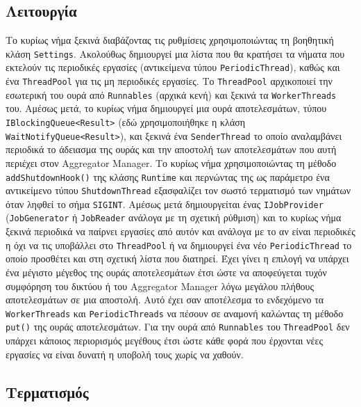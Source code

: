 \documentclass[a4paper,11pt]{article}
\begin{document}
\begin{sloppypar}
\begin{tabular}{lp{11cm}}
\end{tabular}

\subsection{Λειτουργία}

Το κυρίως νήμα ξεκινά διαβάζοντας τις ρυθμίσεις χρησιμοποιώντας τη βοηθητική κλάση \texttt{Settings}. Ακολούθως δημιουργεί μια λίστα που θα κρατήσει τα νήματα που εκτελούν τις περιοδικές εργασίες (αντικείμενα τύπου \texttt{PeriodicThread}), καθώς και ένα \texttt{ThreadPool} για τις μη περιοδικές εργασίες. Το \texttt{ThreadPool} αρχικοποιεί την εσωτερική του ουρά από \texttt{Runnables} (αρχικά κενή) και ξεκινά τα \texttt{WorkerThreads} του. Αμέσως μετά, το κυρίως νήμα δημιουργεί μια ουρά αποτελεσμάτων, τύπου \texttt{IBlockingQueue<Result>} (εδώ χρησιμοποιήθηκε η κλάση \texttt{WaitNotifyQueue<Result>}), και ξεκινά ένα \texttt{SenderThread} το οποίο αναλαμβάνει περιοδικά το άδειασμα της ουράς και την αποστολή των αποτελεσμάτων που αυτή περιέχει στον Aggregator Manager. Το κυρίως νήμα χρησιμοποιώντας τη μέθοδο \texttt{addShutdownHook()} της κλάσης \texttt{Runtime} και περνώντας της ως παράμετρο ένα αντικείμενο τύπου \texttt{ShutdownThread} εξασφαλίζει τον σωστό τερματισμό των νημάτων όταν ληφθεί το σήμα \texttt{SIGINT}. Αμέσως μετά δημιουργείται ένας \texttt{IJobProvider} (\texttt{JobGenerator} ή \texttt{JobReader} ανάλογα με τη σχετική ρύθμιση) και το κυρίως νήμα ξεκινά περιοδικά να παίρνει εργασίες από αυτόν και ανάλογα με το αν είναι περιοδικές η όχι να τις υποβάλλει στο \texttt{ThreadPool} ή να δημιουργεί ένα νέο \texttt{PeriodicThread} το οποίο προσθέτει και στη σχετική λίστα που διατηρεί. Έχει γίνει η επιλογή να υπάρχει ένα μέγιστο μέγεθος της ουράς αποτελεσμάτων έτσι ώστε να αποφεύγεται τυχόν συμφόρηση του δικτύου ή του Aggregator Manager λόγω μεγάλου πλήθους αποτελεσμάτων σε μια αποστολή. Αυτό έχει σαν αποτέλεσμα το ενδεχόμενο τα \texttt{WorkerThreads} και \texttt{PeriodicThreads} να πέσουν σε αναμονή καλώντας τη μέθοδο \texttt{put()} της ουράς αποτελεσμάτων. Για την ουρά από \texttt{Runnables} του \texttt{ThreadPool} δεν υπάρχει κάποιος περιορισμός μεγέθους έτσι ώστε κάθε φορά που έρχονται νέες εργασίες να είναι δυνατή η υποβολή τους χωρίς να χαθούν.

\subsection{Τερματισμός}


\end{sloppypar}
\end{document}
